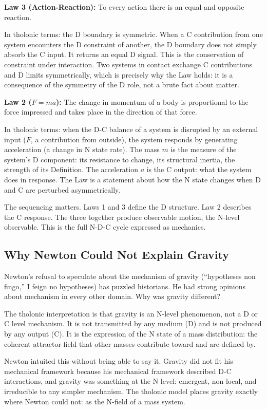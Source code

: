 \documentclass[12pt]{article}
\begin{document}
\textbf{Law 3 (Action-Reaction):} To every action there is an equal and
opposite reaction.

In tholonic terms: the D boundary is symmetric. When a C contribution
from one system encounters the D constraint of another, the D boundary
does not simply absorb the C input. It returns an equal D signal. This
is the conservation of constraint under interaction. Two systems in
contact exchange C contributions and D limits symmetrically, which is
precisely why the Law holds: it is a consequence of the symmetry of the
D role, not a brute fact about matter.

\textbf{Law 2 (\(F = ma\)):} The change in momentum of a body is
proportional to the force impressed and takes place in the direction of
that force.

In tholonic terms: when the D-C balance of a system is disrupted by an
external input (\(F\), a contribution from outside), the system responds
by generating acceleration (a change in N state rate). The mass \(m\) is
the measure of the system's D component: its resistance to change, its
structural inertia, the strength of its Definition. The acceleration
\(a\) is the C output: what the system does in response. The Law is a
statement about how the N state changes when D and C are perturbed
asymmetrically.

The sequencing matters. Laws 1 and 3 define the D structure. Law 2
describes the C response. The three together produce observable motion,
the N-level observable. This is the full N-D-C cycle expressed as
mechanics.

\subsection{Why Newton Could Not Explain Gravity}\label{why-newton-could-not-explain-gravity}

Newton's refusal to speculate about the mechanism of gravity
(``hypotheses non fingo,'' I feign no hypotheses) has puzzled
historians. He had strong opinions about mechanism in every other
domain. Why was gravity different?

The tholonic interpretation is that gravity is an N-level phenomenon,
not a D or C level mechanism. It is not transmitted by any medium (D)
and is not produced by any output (C). It is the expression of the N
state of a mass distribution: the coherent attractor field that other
masses contribute toward and are defined by.

Newton intuited this without being able to say it. Gravity did not fit
his mechanical framework because his mechanical framework described D-C
interactions, and gravity was something at the N level: emergent,
non-local, and irreducible to any simpler mechanism. The tholonic model
places gravity exactly where Newton could not: as the N-field of a mass
system.
\end{document}
